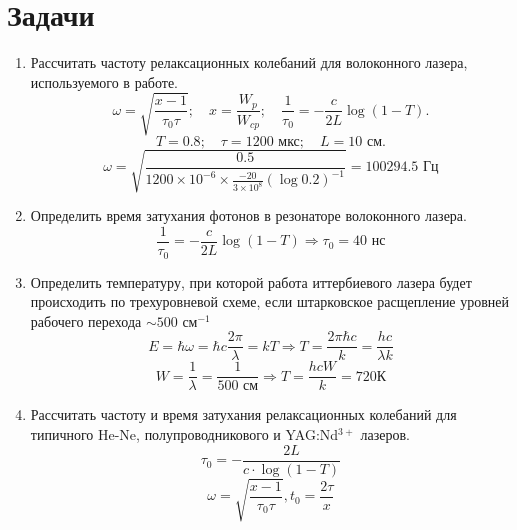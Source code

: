 \documentclass[a4paper, 12pt]{article}
\begin{document}
	\section{Задачи}
	\begin{enumerate}
			\item Рассчитать частоту релаксационных колебаний для волоконного лазера, используемого в работе.
			\begin{equation*}
				\omega=\sqrt{\frac{x-1}{\tau_0\tau}};\quad x=\frac{W_p}{W_{cp}};\quad \frac{1}{\tau_0}=-\frac{c}{2L}\log\left(1-T\right).
			\end{equation*}
			\begin{equation*}
				T=0.8;\quad \tau=1200 \text{ мкс};\quad L=10\text{ см}.
			\end{equation*}
			\begin{equation*}
				\omega=\sqrt{\frac{0.5}{1200\times10^{-6}\times\frac{-20}{3\times10^8}\left(\log0.2\right)^{-1}}}=100294.5\text{ Гц}
			\end{equation*}
			\item Определить время затухания фотонов в резонаторе волоконного лазера.
			\begin{equation*}
				\frac{1}{\tau_0}=-\frac{c}{2L}\log\left(1-T\right)\Rightarrow \tau_0=40\text{ нс}
			\end{equation*}
			\item Определить температуру, при которой работа иттербиевого лазера будет происходить по трехуровневой схеме, если штарковское расщепление уровней рабочего перехода $\sim 500\text{ см}^{-1}$
				\begin{equation*}
					E=\hbar\omega=\hbar c \frac{2\pi}{\lambda}=kT\Rightarrow T=\frac{2\pi\hbar c}{k}=\frac{hc}{\lambda k}
				\end{equation*}
				\begin{equation*}
					W=\frac{1}{\lambda}=\frac{1}{500\text{ см}}\Rightarrow T=\frac{hcW}{k}=720\text{К}
				\end{equation*}
			\item Рассчитать частоту и время затухания релаксационных колебаний для типичного He-Ne, полупроводникового и YAG:Nd$^{3+}$ лазеров.
			\begin{equation*}
				\tau_0=-\frac{2L}{c\cdot\log\left(1-T\right)}
			\end{equation*}
			\begin{equation*}
				\omega=\sqrt{\frac{x-1}{\tau_0\tau}}, t_0=\frac{2\tau}{x}
			\end{equation*}
			\begin{table}[h]

\end{table}
\end{enumerate}
\end{document}
